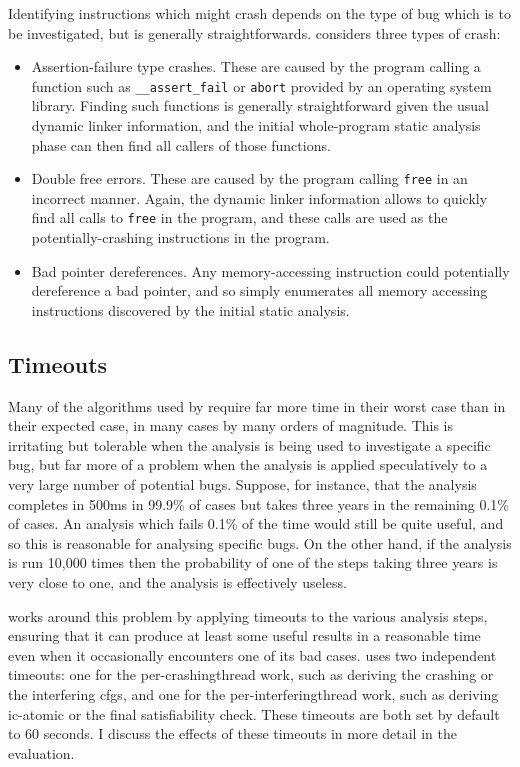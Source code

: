 Identifying instructions which might crash depends on the type of bug
which is to be investigated, but is generally straightforwards.
{\Implementation} considers three types of crash:

\begin{itemize}
\item Assertion-failure type crashes.  These are caused by the program
  calling a function such as \verb|__assert_fail| or \verb|abort|
  provided by an operating system library.  Finding such functions is
  generally straightforward given the usual dynamic linker
  information, and the initial whole-program static analysis phase can
  then find all callers of those functions.
\item Double free errors.  These are caused by the program calling
  \verb|free| in an incorrect manner.  Again, the dynamic linker
  information allows {\implementation} to quickly find all calls to
  \verb|free| in the program, and these calls are used as the
  potentially-crashing instructions in the program.
\item Bad pointer dereferences.  Any memory-accessing instruction
  could potentially dereference a bad pointer, and so
  {\implementation} simply enumerates all memory accessing
  instructions discovered by the initial static analysis.
\end{itemize}

\subsection{Timeouts}

Many of the algorithms used by {\technique} require far more time in
their worst case than in their expected case, in many cases by many
orders of magnitude.  This is irritating but tolerable when the
analysis is being used to investigate a specific bug, but far more of
a problem when the analysis is applied speculatively to a very large
number of potential bugs.  Suppose, for instance, that the analysis
completes in 500ms in 99.9\% of cases but takes three years in the
remaining 0.1\% of cases.  An analysis which fails 0.1\% of the time
would still be quite useful, and so this is reasonable for analysing
specific bugs.  On the other hand, if the analysis is run 10,000 times
then the probability of one of the steps taking three years is very
close to one, and the analysis is effectively useless.

{\Technique} works around this problem by applying timeouts to the
various analysis steps, ensuring that it can produce at least some
useful results in a reasonable time even when it occasionally
encounters one of its bad cases.  {\Implementation} uses two
independent timeouts: one for the per-\gls{crashingthread} work, such
as deriving the crashing {\StateMachine} or the interfering
\glspl{cfg}, and one for the per-\gls{interferingthread} work, such as
deriving \gls{ic-atomic} or the final satisfiability check.  These
timeouts are both set by default to 60 seconds.  I discuss the effects
of these timeouts in more detail in the evaluation.

